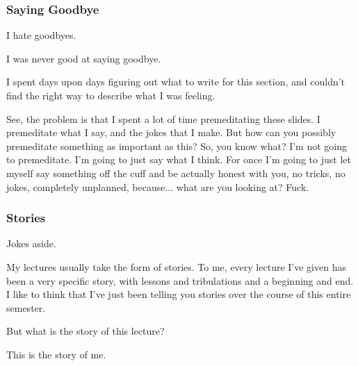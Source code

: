 \documentclass[aspectratio=169, handout]{beamer}
\begin{document}
\begin{frame}[fragile]
  \frametitle{Saying Goodbye}

  I hate goodbyes.

  \pause
  \vspace{\fill}

  I was never good at saying goodbye.

  \pause
  \vspace{\fill}

  I spent days upon days figuring out what to write for this section, and
  couldn't find the right way to describe what I was feeling.

  \pause
  \vspace{\fill}

  See, the problem is that I spent a lot of time premeditating these slides. I
  premeditate what I say, and the jokes that I make. But how can you possibly
  premeditate something as important as this? So, you know what? I'm
  not going to premeditate. I'm going to just say what I think. For once I'm
  going to just let myself say something off the cuff and be actually honest with
  you, no tricks, no jokes, completely unplanned, because... what are you looking at? Fuck.
\end{frame}

\begin{frame}[fragile]
  \frametitle{Stories}

  Jokes aside.

  \pause
  \vspace{\fill}

  My lectures usually take the form of stories. To me, every lecture I've given
  has been a very specific story, with lessons and tribulations and a beginning
  and end. I like to think that I've just been telling you stories over the
  course of this entire semester.

  \pause
  \vspace{\fill}

  But what is the story of this lecture?

  \pause
  \vspace{\fill}

  This is the story of me.

\end{frame}
\end{document}
